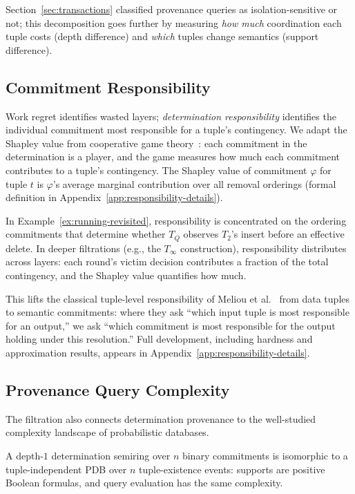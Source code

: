 \documentclass[acmsmall,review,anonymous]{acmart}
\theoremstyle{remark}
\numberwithin{definition}{section}
\numberwithin{theorem}{section}
\numberwithin{lemma}{section}
\numberwithin{corollary}{section}
\numberwithin{remark}{section}
\numberwithin{example}{section}
\numberwithin{observation}{section}
\numberwithin{assumption}{section}
\begin{document}
\noindent
Section~\ref{sec:transactions} classified provenance queries as
isolation-sensitive or not; this decomposition goes further by
measuring \emph{how much} coordination each tuple costs (depth
difference) and \emph{which} tuples change semantics (support
difference).

\subsection{Commitment Responsibility}

Work regret identifies wasted layers; \emph{determination
responsibility} identifies the individual commitment most responsible
for a tuple's contingency.
We adapt the Shapley value from cooperative game
theory~\cite{livshits2021shapley}: each commitment in the
determination is a player, and the game measures how much each
commitment contributes to a tuple's contingency.
The Shapley value of commitment $\varphi$ for tuple $t$ is
$\varphi$'s average marginal contribution over all removal orderings
(formal definition in Appendix~\ref{app:responsibility-details}).

In Example~\ref{ex:running-revisited}, responsibility is concentrated
on the ordering commitments that determine whether $T_Q$ observes
$T_2$'s insert before an effective delete.
In deeper filtrations (e.g., the $T_\infty$ construction),
responsibility distributes across layers: each round's victim decision
contributes a fraction of the total contingency, and the Shapley value
quantifies how much.

This lifts the classical tuple-level responsibility of Meliou et
al.~\cite{meliou2010causality} from data tuples to semantic
commitments: where they ask ``which input tuple is most responsible
for an output,'' we ask ``which commitment is most responsible for the
output holding under this resolution.''
Full development, including hardness and approximation results,
appears in Appendix~\ref{app:responsibility-details}.

\subsection{Provenance Query Complexity}

The filtration also connects determination provenance to the
well-studied complexity landscape of probabilistic databases.

\begin{proposition}[Depth-$1$ = tuple-independent PDB]
  \label{prop:layered-pdb}
  A depth-$1$ determination semiring over $n$ binary commitments is
  isomorphic to a tuple-independent PDB over $n$ tuple-existence
  events: supports are positive Boolean formulas, and query evaluation
  has the same complexity.
\end{proposition}
\end{document}
